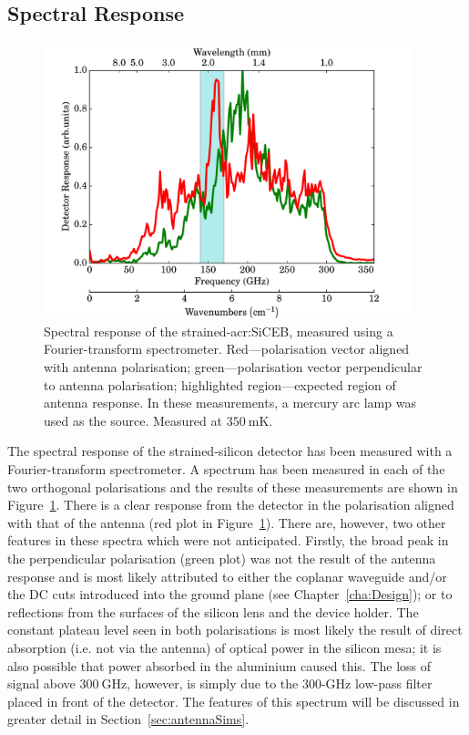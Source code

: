 \subsection{Spectral Response}\label{ssec:opticalStrainedSi_spectral}
\begin{figure}[tb]
\begin{center}
\includegraphics[width = 0.95\textwidth]{figures/strained_FTS}
\caption[Spectral response of the strained-\gls{acr:SiCEB}]{Spectral response of the strained-\gls{acr:SiCEB}, measured using a Fourier-transform spectrometer. Red---polarisation vector aligned with antenna polarisation; green---polarisation vector perpendicular to antenna polarisation; highlighted region---expected region of antenna response. In these measurements, a mercury arc lamp was used as the source. Measured at $350~\mathrm{mK}$.}
\label{fig:strainedSpectrum}
\end{center}
\end{figure}
The spectral response of the strained-silicon detector has been measured with a Fourier-transform spectrometer. A spectrum has been measured in each of the two orthogonal polarisations and the results of these measurements are shown in Figure~\ref{fig:strainedSpectrum}. There is a clear response from the detector in the polarisation aligned with that of the antenna (red plot in Figure~\ref{fig:strainedSpectrum}). There are, however, two other features in these spectra which were not anticipated. Firstly, the broad peak in the perpendicular polarisation (green plot) was not the result of the antenna response and is most likely attributed to either the coplanar waveguide and/or the DC cuts introduced into the ground plane (see Chapter~\ref{cha:Design}); or to reflections from the surfaces of the silicon lens and the device holder. The constant plateau level seen in both polarisations is most likely the result of direct absorption (i.e. not via the antenna) of optical power in the silicon mesa; it is also possible that power absorbed in the aluminium caused this. The loss of signal above $300~\mathrm{GHz}$, however, is simply due to the 300-GHz low-pass filter placed in front of the detector. The features of this spectrum will be discussed in greater detail in Section~\ref{sec:antennaSims}.
%
